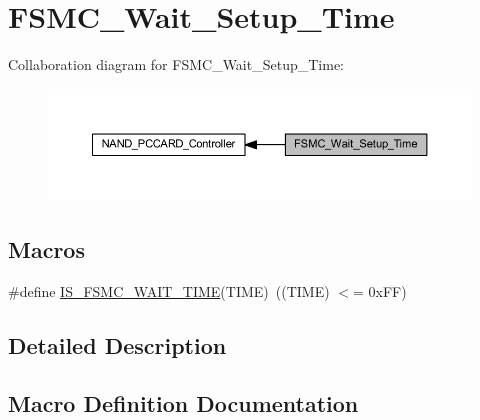 \hypertarget{group___f_s_m_c___wait___setup___time}{}\section{F\+S\+M\+C\+\_\+\+Wait\+\_\+\+Setup\+\_\+\+Time}
\label{group___f_s_m_c___wait___setup___time}
Collaboration diagram for F\+S\+M\+C\+\_\+\+Wait\+\_\+\+Setup\+\_\+\+Time\+:
\nopagebreak
\begin{figure}[H]
\begin{center}
\leavevmode
\includegraphics[width=350pt]{group___f_s_m_c___wait___setup___time}
\end{center}
\end{figure}
\subsection*{Macros}
\begin{DoxyCompactItemize}
\item 
\#define \hyperlink{group___f_s_m_c___wait___setup___time_ga5c0efc48afb916ceff32868940f81613}{I\+S\+\_\+\+F\+S\+M\+C\+\_\+\+W\+A\+I\+T\+\_\+\+T\+I\+ME}(T\+I\+ME)~((T\+I\+ME) $<$= 0x\+F\+F)
\end{DoxyCompactItemize}


\subsection{Detailed Description}


\subsection{Macro Definition Documentation}
\mbox{\label{group___f_s_m_c___wait___setup___time_ga5c0efc48afb916ceff32868940f81613}} 
